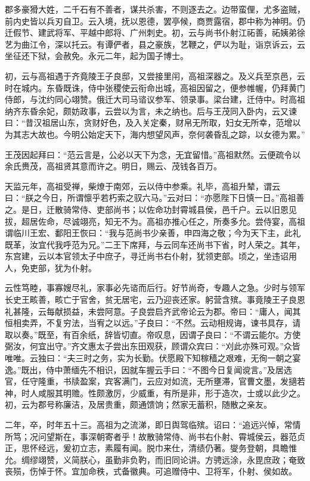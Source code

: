 \documentclass[12pt,UTF8]{ctexbook}
\begin{document}
郡多豪猾大姓，二千石有不善者，谋共杀害，不则逐去之。边带蛮俚，尤多盗贼，前内史皆以兵刃自卫。云入境，抚以恩德，罢亭候，商贾露宿，郡中称为神明。仍迁假节、建武将军、平越中郎将、广州刺史。初，云与尚书仆射江祏善，祏姨弟徐艺为曲江令，深以托云。有谭俨者，县之豪族，艺鞭之，俨以为耻，诣京诉云，云坐征还下狱，会赦免。永元二年，起为国子博士。

初，云与高祖遇于齐竟陵王子良邸，又尝接里闬，高祖深器之。及义兵至京邑，云时在城内。东昏既诛，侍中张稷使云衔命出城，高祖因留之，便参帷幄，仍拜黄门侍郎，与沈约同心翊赞。俄迁大司马谘议参军、领录事。梁台建，迁侍中。时高祖纳齐东昏余妃，颇妨政事，云尝以为言，未之纳也。后与王茂同入卧内，云又谏曰：“昔汉祖居山东，贪财好色，及入关定秦，财帛无所取，妇女无所幸，范增以为其志大故也。今明公始定天下，海内想望风声，奈何袭昏乱之踪，以女德为累。”

王茂因起拜曰：“范云言是，公必以天下为念，无宜留惜。”高祖默然。云便疏令以余氏赉茂，高祖贤其意而许之。明日，赐云、茂钱各百万。

天监元年，高祖受禅，柴燎于南郊，云以侍中参乘。礼毕，高祖升辇，谓云曰：“朕之今日，所谓懔乎若朽索之驭六马。”云对曰：“亦愿陛下日慎一日。”高祖善之。是日，迁散骑常侍、吏部尚书；以佐命功封霄城县侯，邑千户。云以旧恩见拔，超居佐命，尽诚翊亮，知无不为。高祖亦推心任之，所奏多允。尝侍宴，高祖谓临川王宏、鄱阳王恢曰：“我与范尚书少亲善，申四海之敬；今为天下主，此礼既革，汝宜代我呼范为兄。”二王下席拜，与云同车还尚书下省，时人荣之。其年，东宫建，云以本官领太子中庶子，寻迁尚书右仆射，犹领吏部。顷之，坐违诏用人，免吏部，犹为仆射。

云性笃睦，事寡嫂尽礼，家事必先谘而后行。好节尚奇，专趣人之急。少时与领军长史王畡善，畡亡于官舍，贫无居宅，云乃迎丧还家。躬营含殡。事竟陵王子良恩礼甚隆，云每献损益，未尝阿意。子良尝启齐武帝论云为郡。帝曰：“庸人，闻其恒相卖弄，不复穷法，当宥之以远。”子良曰：“不然。云动相规诲，谏书具存，请取以奏。”既至，有百余纸，辞皆切直。帝叹息，因谓子良曰：“不谓云能尔。方使弼汝，何宜出守。”齐文惠太子尝出东田观获，顾谓众宾曰：“刈此亦殊可观。”众皆唯唯。云独曰：“夫三时之务，实为长勤。伏愿殿下知稼穑之艰难，无徇一朝之宴逸。”既出，侍中萧缅先不相识，因就车握云手曰：“不图今日复闻谠言。”及居选官，任守隆重，书牍盈案，宾客满门，云应对如流，无所壅滞，官曹文墨，发擿若神，时人咸服其明赡。性颇激厉，少威重，有所是非，形于造次，士或以此少之。初，云为郡号称廉洁，及居贵重，颇通馈饷；然家无蓄积，随散之亲友。

二年，卒，时年五十三。高祖为之流涕，即日舆驾临殡。诏曰：“追远兴悼，常情所笃；况问望斯在，事深朝寄者乎！故散骑常侍、尚书右仆射、霄城侯云，器范贞正，思怀经远，爰初立志，素履有闻。脱巾来仕，清绩仍著。燮务登朝，具瞻惟允。绸缪翊赞，义简朕心，虽勤非负靮，而旧同论讲。方骋远涂，永毘庶政；奄致丧殒，伤悼于怀。宜加命秩，式备徽典。可追赠侍中、卫将军，仆射、侯如故。
\end{document}
